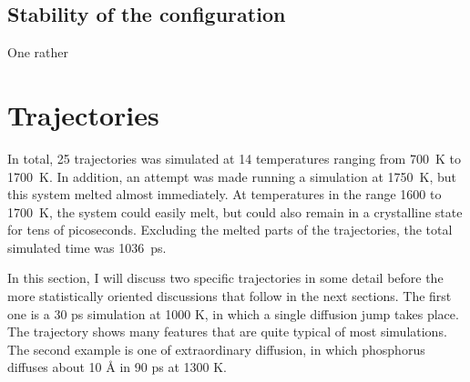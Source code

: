 \documentclass[11pt,bibliography=totoc,index=totoc]{scrbook}   %
\begin{document}
%
\subsection{Stability of the  configuration}
%

One rather 




%
\section{Trajectories}
%




In total, 25 trajectories was simulated at 14 temperatures ranging from \SI{700}{\kelvin} to \SI{1700}{\kelvin}.
In addition, an attempt was made running a simulation at 1750~K, but this system melted almost immediately.
At temperatures in the range 1600 to \SI{1700}{\kelvin}, the system could easily melt, 
but could also remain in a crystalline state for tens of picoseconds.
Excluding the melted parts of the trajectories, the total simulated time was 1036~ps.

In this section, I will discuss two specific trajectories in some detail before the more statistically oriented discussions that follow in the next sections.
The first one is a 30 ps simulation at 1000 K, in which a single diffusion jump takes place. 
The trajectory shows many features that are quite typical of most simulations.
The second example is one of extraordinary diffusion, in which phosphorus diffuses about 10 Å in 90 ps at 1300 K.
\end{document}

